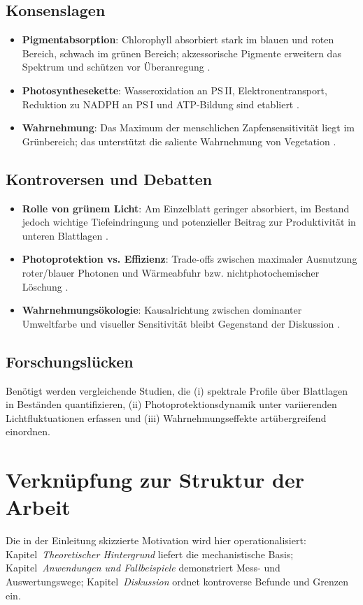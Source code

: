 \subsection{Konsenslagen}
\begin{itemize}
  \item \textbf{Pigmentabsorption}: Chlorophyll absorbiert stark im blauen und roten Bereich, schwach im grünen Bereich; akzessorische Pigmente erweitern das Spektrum und schützen vor Überanregung \parencite{meyer2018photosynthese, schmidt2015chlorophyll, gao2010lightabsorption}.
  \item \textbf{Photosynthesekette}: Wasseroxidation an PS\,II, Elektronentransport, Reduktion zu NADPH an PS\,I und ATP-Bildung sind etabliert \parencite{zhao2012chlorophyll}.
  \item \textbf{Wahrnehmung}: Das Maximum der menschlichen Zapfensensitivität liegt im Grünbereich; das unterstützt die saliente Wahrnehmung von Vegetation \parencite{renoult2017evolution}.
\end{itemize}

\subsection{Kontroversen und Debatten}
\begin{itemize}
  \item \textbf{Rolle von grünem Licht}: Am Einzelblatt geringer absorbiert, im Bestand jedoch wichtige Tiefeindringung und potenzieller Beitrag zur Produktivität in unteren Blattlagen \parencite{zhao2012chlorophyll}.
  \item \textbf{Photoprotektion vs. Effizienz}: Trade-offs zwischen maximaler Ausnutzung roter/blauer Photonen und Wärmeabfuhr bzw. nichtphotochemischer Löschung \parencite{gao2010lightabsorption}.
  \item \textbf{Wahrnehmungsökologie}: Kausalrichtung zwischen dominanter Umweltfarbe und visueller Sensitivität bleibt Gegenstand der Diskussion \parencite{renoult2017evolution}.
\end{itemize}

\subsection{Forschungslücken}
Benötigt werden vergleichende Studien, die (i) spektrale Profile über Blattlagen in Beständen quantifizieren, (ii) Photoprotektionsdynamik unter variierenden Lichtfluktuationen erfassen und (iii) Wahrnehmungseffekte artübergreifend einordnen.

\section{Verknüpfung zur Struktur der Arbeit}
Die in der Einleitung skizzierte Motivation wird hier operationalisiert: Kapitel~\emph{Theoretischer Hintergrund} liefert die mechanistische Basis; Kapitel~\emph{Anwendungen und Fallbeispiele} demonstriert Mess- und Auswertungswege; Kapitel~\emph{Diskussion} ordnet kontroverse Befunde und Grenzen ein.
